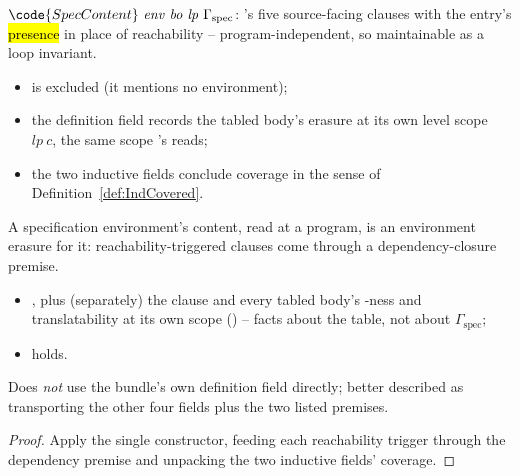 \begin{definition}
\label{def:SpecContent}
\leanok
{}
 $\code{SpecContent}\ \mathit{env}\ \mathit{bo}\ \mathit{lp}\ \Gamma_{\mathrm{spec}}$: \ErasesEnv{}'s five source-facing clauses with the entry's \hl{presence} in place of reachability -- program-independent, so maintainable as a loop invariant.
\begin{itemize}
\item {} is excluded (it mentions no environment);
\item the definition field records the tabled body's erasure at its own level scope $\mathit{lp}\ c$, the same scope \ErasesEnv{}'s  reads;
\item the two inductive fields conclude coverage in the sense of Definition~\ref{def:IndCovered}.
\end{itemize}
\end{definition}

\begin{lemma}
\label{lem:SpecContent-erasesEnv}
\leanok
{}
 A specification environment's content, read at a program, is an environment erasure for it: reachability-triggered clauses come through a dependency-closure premise.
\begin{itemize}
\item {} , plus (separately) the  clause and every
tabled body's -ness and translatability at its own scope () -- facts about the table, not about $\Gamma_{\mathrm{spec}}$;
\item {} \ErasesEnv{} holds.
\end{itemize}
 Does \emph{not} use the bundle's own definition field directly; better described as transporting the other four fields plus the two listed premises.
\end{lemma}
\begin{proof}
\leanok
{}
 Apply the single constructor, feeding each reachability trigger through the dependency premise and unpacking the two inductive fields' coverage.
\end{proof}

